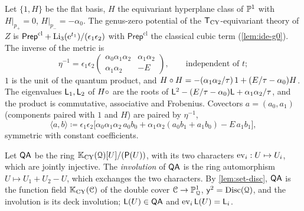 \begin{prop}
\label{prop:set-frob}
Let $\{1,H\}$ be the flat basis, $H$ the equivariant hyperplane class of $\mathbb{P}^1$ with $H|_{p_+}=0$, $H|_{p_-}=-\alpha_0$. The genus-zero potential of the $\mathsf{T}_{\mathrm{CY}}$-equivariant theory of $Z$ is $\mathsf{Prep}^{\mathrm{cl}}+\operatorname{Li}_3(\mathrm{e}^{t_1})/(\epsilon_1\epsilon_2)$ with $\mathsf{Prep}^{\mathrm{cl}}$ the classical cubic term (\cref{lem:ide-g0}). The inverse of the metric is
\[
\eta^{-1}=\epsilon_1\epsilon_2\begin{pmatrix}\alpha_0\alpha_1\alpha_2&\alpha_1\alpha_2\\\alpha_1\alpha_2&-E\end{pmatrix},
\qquad\text{independent of }t;
\]
$1$ is the unit of the quantum product, and $H\circ H=-(\alpha_1\alpha_2/\tau)\,1+(E/\tau-\alpha_0)H$. The eigenvalues $\mathsf{L}_1,\mathsf{L}_2$ of $H\circ$ are the roots of $\mathsf{L}^2-(E/\tau-\alpha_0)\mathsf{L}+\alpha_1\alpha_2/\tau$, and the product is commutative, associative and Frobenius. Covectors $a=(a_0,a_1)$ (components paired with $1$ and $H$) are paired by $\eta^{-1}$,
\begin{equation}
\label{eq:set-pairing}
\langle a,b\rangle\coloneqq\epsilon_1\epsilon_2\big[\alpha_0\alpha_1\alpha_2\,a_0b_0+\alpha_1\alpha_2(a_0b_1+a_1b_0)-E\,a_1b_1\big],
\end{equation}
symmetric with constant coefficients.
\end{prop}

\begin{defn}
\label{def:set-QA}
Let $\mathsf{QA}$ be the ring $\mathbb{K}_{\mathrm{CY}}(\mathcal{Q})[U]/(\mathsf{P}(U))$, with its two characters $\operatorname{ev}_i:U\mapsto U_i$, which are jointly injective. The \emph{involution} of $\mathsf{QA}$ is the ring automorphism $U\mapsto U_1+U_2-U$, which exchanges the two characters. By \cref{lem:set-disc}, $\mathsf{QA}$ is the function field $\mathbb{K}_{\mathrm{CY}}(\mathcal{C})$ of the double cover $\mathcal{C}\to\mathbb{P}^1_{\mathcal{Q}}$, $\mathsf{y}^2=\operatorname{Disc}(\mathcal{Q})$, and the involution is its deck involution; $\mathsf{L}(U)\in\mathsf{QA}$ and $\operatorname{ev}_i\mathsf{L}(U)=\mathsf{L}_i$.
\end{defn}

